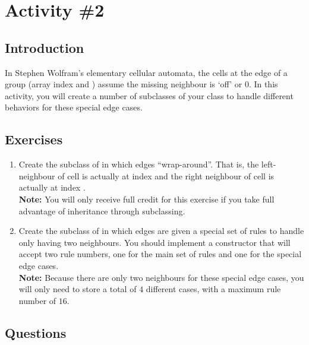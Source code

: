   \pagebreak

	\section{Activity \#2}
		\subsection{Introduction}
			In Stephen Wolfram's elementary cellular automata, the cells at the edge of a group (array index  and ) assume the missing neighbour is `off' or $0$. In this activity, you will create a number of subclasses of your  class to handle different behaviors for these special edge cases.

		\subsection{Exercises}
			\begin{enumerate}
				\item Create the  subclass of  in which edges ``wrap-around''. That is, the left-neighbour of cell  is actually at index  and the right neighbour of cell  is actually at index .\\
				{\small\textbf{Note:} You will only receive full credit for this exercise if you take full advantage of inheritance through subclassing.}
				\item Create the  subclass of  in which edges are given a special set of rules to handle only having two neighbours. You should implement a constructor that will accept two rule numbers, one for the main set of rules and one for the special edge cases.\\
				{\small\textbf{Note:} Because there are only two neighbours for these special edge cases, you will only need to store a total of $4$ different cases, with a maximum rule number of $16$.}
			\end{enumerate}

		\subsection{Questions}
			\ \\[9pt]

